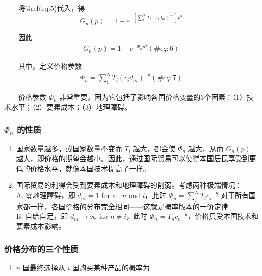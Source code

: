\documentclass[]{tufte-handout}
\providecommand{\tightlist}{%
  \setlength{\itemsep}{0pt}\setlength{\parskip}{0pt}}
\begin{document}
　　将@ref(eq:5)代入，得
\[G_n\left(p\right)=1-e^{-[\sum_{1}^{N}T_{i} ( {{c_i}d_{ni}})^{-\theta}]p^{\theta}} \]

　　因此 \begin{align}
G_{n}(p)=1-e^{-\Phi_{n} n^{\theta}}  (\#eq:6)
\end{align}

　　其中，定义价格参数 \begin{align}
\Phi_{n} = \sum_{1}^{N}T_{i} ( {{c_i}d_{ni}})^{-\theta}  (\#eq:7)
\end{align}

　　价格参数 \(\Phi_n\)
非常重要，因为它包括了影响各国价格变量的3个因素：（1）技术水平；（2）要素成本；（3）地理障碍。

\hypertarget{phi_n-ux7684ux6027ux8d28}{%
\subsubsection{\texorpdfstring{\(\Phi_n\)
的性质}{\textbackslash Phi\_n 的性质}}\label{phi_n-ux7684ux6027ux8d28}}

\begin{enumerate}
\def\labelenumi{\arabic{enumi}.}
\tightlist
\item
  国家数量越多，或国家数量不变而 \(T_i\) 越大，都会使 \(\Phi_n\)
  越大，从而 \(G_{n}(p)\)
  越大，即价格的期望会越小。因此，通过国际贸易可以使得本国居民享受到更低的价格水平，就像本国技术提高了一样。\\
\item
  国际贸易的利得会受到要素成本和地理障碍的削弱。考虑两种极端情况：\\
  A. 零地理障碍，即 \(d_{n i}=1\) for all \(n\) and \(i\)，此时
  \(\Phi_{n} = \sum_{1}^{N}T_{i}{c_i}^{-\theta}\)
  对于所有国家都一样，各国价格的分布完全相同------这就是概率版本的一价定律\\
  B. 自给自足，即 \(d_{n i} \rightarrow \infty\) for \(n \neq i\)，此时
  \(\Phi_{n} = T_{n}{c_n}^{-\theta}\)，价格只受本国技术和要素成本影响。
\end{enumerate}

\hypertarget{ux4ef7ux683cux5206ux5e03ux7684ux4e09ux4e2aux6027ux8d28}{%
\subsubsection{价格分布的三个性质}\label{ux4ef7ux683cux5206ux5e03ux7684ux4e09ux4e2aux6027ux8d28}}

\begin{enumerate}
\def\labelenumi{\arabic{enumi}.}
\tightlist
\item
  \(n\) 国最终选择从 \(i\) 国购买某种产品的概率为
\end{enumerate}
\end{document}
